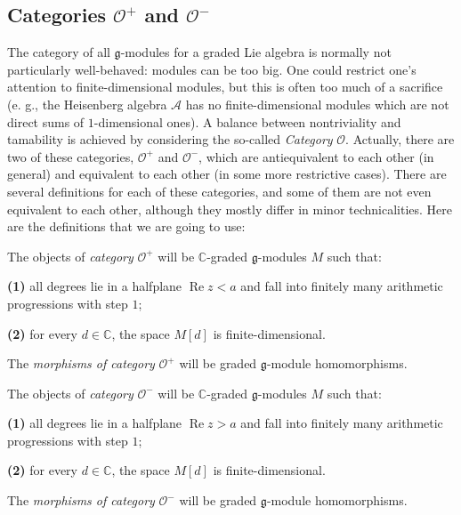 \documentclass[etingof-lie.tex]{subfiles}
\begin{document}
\subsection{Categories \texorpdfstring{$\mathcal{O}^{+}$}{O-plus} and
\texorpdfstring{$\mathcal{O}^{-}$}{O-minus}}

The category of all $\mathfrak{g}$-modules for a graded Lie algebra is
normally not particularly well-behaved: modules can be too big. One could
restrict one's attention to finite-dimensional modules, but this is often too
much of a sacrifice (e. g., the Heisenberg algebra $\mathcal{A}$ has no
finite-dimensional modules which are not direct sums of $1$-dimensional ones).
A balance between nontriviality and tamability is achieved by considering the
so-called \textit{Category }$\mathcal{O}$. Actually, there are two of these
categories, $\mathcal{O}^{+}$ and $\mathcal{O}^{-}$, which are antiequivalent
to each other (in general) and equivalent to each other (in some more
restrictive cases). There are several definitions for each of these
categories, and some of them are not even equivalent to each other, although
they mostly differ in minor technicalities. Here are the definitions that we
are going to use:

\begin{definition}
\label{def.O+}The objects of \textit{category }$\mathcal{O}^{+}$ will be
$\mathbb{C}$-graded $\mathfrak{g}$-modules $M$ such that:

\textbf{(1)} all degrees lie in a halfplane $\operatorname{Re}z<a$ and fall
into finitely many arithmetic progressions with step $1$;

\textbf{(2)} for every $d\in\mathbb{C}$, the space $M\left[  d\right]  $ is finite-dimensional.

The \textit{morphisms of category }$\mathcal{O}^{+}$ will be graded
$\mathfrak{g}$-module homomorphisms.
\end{definition}

\begin{definition}
\label{def.O-}The objects of \textit{category }$\mathcal{O}^{-}$ will be
$\mathbb{C}$-graded $\mathfrak{g}$-modules $M$ such that:

\textbf{(1)} all degrees lie in a halfplane $\operatorname{Re}z>a$ and fall
into finitely many arithmetic progressions with step $1$;

\textbf{(2)} for every $d\in\mathbb{C}$, the space $M\left[  d\right]  $ is finite-dimensional.

The \textit{morphisms of category }$\mathcal{O}^{-}$ will be graded
$\mathfrak{g}$-module homomorphisms.
\end{definition}
\end{document}
